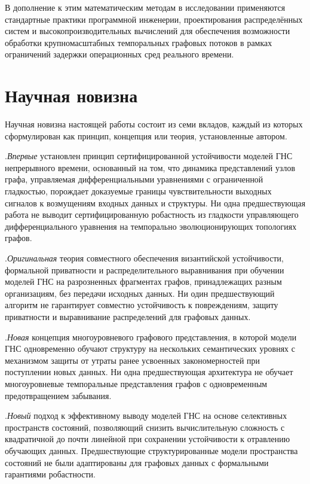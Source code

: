 В дополнение к этим математическим методам в исследовании применяются стандартные практики программной инженерии, проектирования распределённых систем и высокопроизводительных вычислений для обеспечения возможности обработки крупномасштабных темпоральных графовых потоков в рамках ограничений задержки операционных сред реального времени.


\section*{Научная новизна}

Научная новизна настоящей работы состоит из семи вкладов, каждый из которых сформулирован как принцип, концепция или теория, установленные автором.

.\quad \emph{Впервые} установлен принцип сертифицированной устойчивости моделей ГНС непрерывного времени, основанный на том, что динамика представлений узлов графа, управляемая дифференциальными уравнениями с ограниченной гладкостью, порождает доказуемые границы чувствительности выходных сигналов к возмущениям входных данных и структуры. Ни одна предшествующая работа не выводит сертифицированную робастность из гладкости управляющего дифференциального уравнения на темпорально эволюционирующих топологиях графов.

.\quad \emph{Оригинальная} теория совместного обеспечения византийской устойчивости, формальной приватности и распределительного выравнивания при обучении моделей ГНС на разрозненных фрагментах графов, принадлежащих разным организациям, без передачи исходных данных. Ни один предшествующий алгоритм не гарантирует совместно устойчивость к повреждениям, защиту приватности и выравнивание распределений для графовых данных.

.\quad \emph{Новая} концепция многоуровневого графового представления, в которой модели ГНС одновременно обучают структуру на нескольких семантических уровнях с механизмом защиты от утраты ранее усвоенных закономерностей при поступлении новых данных. Ни одна предшествующая архитектура не обучает многоуровневые темпоральные представления графов с одновременным предотвращением забывания.

.\quad \emph{Новый} подход к эффективному выводу моделей ГНС на основе селективных пространств состояний, позволяющий снизить вычислительную сложность с квадратичной до почти линейной при сохранении устойчивости к отравлению обучающих данных. Предшествующие структурированные модели пространства состояний не были адаптированы для графовых данных с формальными гарантиями робастности.

